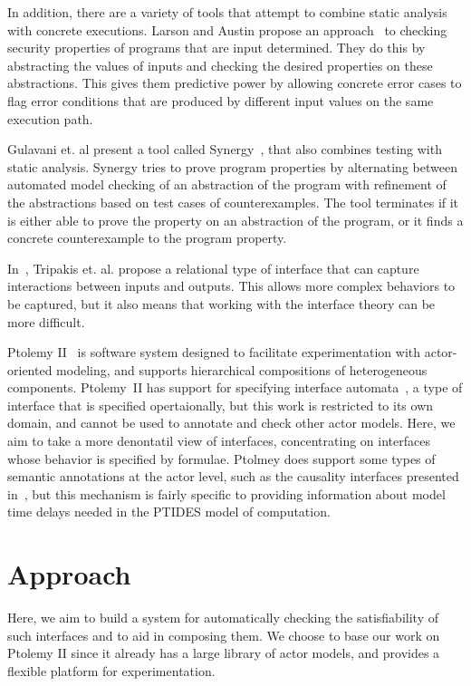 \documentclass[preprint,11pt]{sigplanconf}
\begin{document}
In addition, there are a variety of tools that attempt to combine static analysis
with concrete executions.
%
Larson and Austin propose an approach~\cite{larsonAustin:2003:coverageDetection} 
to checking security properties of programs that are input determined.  They do
this by abstracting the values of inputs and checking the desired properties on
these abstractions. This gives them predictive power by allowing concrete error
cases to flag error conditions that are produced by different input values on the
same execution path.

Gulavani et. al present a tool called Synergy~\cite{gulavani:synergy}, that
also combines testing with static analysis.  Synergy tries to prove program
properties by alternating between automated model checking of an abstraction of
the program with refinement of the abstractions based on test cases of
counterexamples.  The tool terminates if it is either able to prove the property
on an abstraction of the program, or it finds a concrete counterexample to the
program property.

In~\cite{relationalInterfaces}, Tripakis et. al. propose a relational type of
interface that can capture interactions between inputs and outputs.
This allows more complex behaviors to be captured, but it also means that
working with the interface theory can be more difficult.

Ptolemy II~\cite{ptII} is software system designed to facilitate experimentation
with actor-oriented modeling, and supports hierarchical compositions of
heterogeneous components.  Ptolemy~II has support for specifying interface
automata~\cite{Alfaro01interfaceautomata}, a type of interface that is specified
opertaionally, but this work is restricted to its own domain, and cannot be used
to annotate and check other actor models. Here, we aim to take a more denontatil
view of interfaces, concentrating on interfaces whose behavior is specified by
formulae. Ptolmey does support some types of semantic annotations at the actor
level, such as the causality interfaces presented
in~\cite{ZhouLee08_CausalityInterfacesForActorNetworks}, but this mechanism is
fairly specific to providing information about model time delays needed in the
PTIDES model of computation.

\section{Approach} %
Here, we aim to build a system for automatically checking the satisfiability
of such interfaces and to aid in composing them. We choose to base our work on
Ptolemy II since it already has a large library of actor models, and provides a
flexible platform for experimentation.
\end{document}
